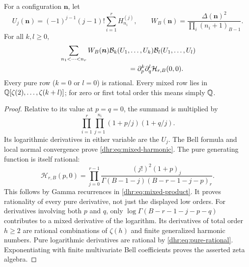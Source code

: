 \begin{theorem}
\label{dhr:thm:mixed}
For a configuration $\bm n$, let
\[
 U_j(\bm n)=(-1)^{j-1}(j-1)!\sum_{i=1}^rH_{n_i}^{(j)},\qquad
 W_B(\bm n)=\frac{\Delta(\bm n)^2}{\prod_i(n_i+1)_{B-1}}.
\]
For all $k,l\geq0$,
\begin{align}
 &\sum_{n_1<\cdots<n_r}W_B(\bm n)
 \Bell_k(U_1,\ldots,U_k)\Bell_l(U_1,\ldots,U_l)\notag\\
 &\hspace{35mm}=\partial_p^k\partial_q^l
               \mathcal H_{r,B}(0,0).
 \label{dhr:eq:mixed-harmonic}
\end{align}
Every pure row ($k=0$ or $l=0$) is rational. Every mixed row lies
in $\mathbb Q[\zeta(2),\ldots,\zeta(k+l)]$; for zero or first total order
this means simply $\mathbb Q$.
\end{theorem}
\begin{proof}
Relative to its value at $p=q=0$, the summand is multiplied by
\[
 \prod_{i=1}^r\prod_{j=1}^{n_i}(1+p/j)(1+q/j).
\]
Its logarithmic derivatives in either variable are the $U_j$.
The Bell formula and local normal convergence prove
\eqref{dhr:eq:mixed-harmonic}. The pure generating function is
itself rational:
\begin{equation}\label{dhr:eq:pure-rational}
 \mathcal H_{r,B}(p,0)=
 \prod_{j=0}^{r-1}
 \frac{(j!)^2(1+p)_j}
 {\Gamma(B-1-j)(B-r-1-j-p)_r}.
\end{equation}
This follows by Gamma recurrences in \eqref{dhr:eq:mixed-product}.
It proves rationality of every pure derivative, not just the displayed
low orders. For derivatives involving both $p$ and $q$, only
$\log\Gamma(B-r-1-j-p-q)$ contributes to a mixed derivative
of the logarithm. Its derivatives of total order $h\geq2$ are
rational combinations of $\zeta(h)$ and finite generalized harmonic
numbers. Pure logarithmic derivatives are rational by
\eqref{dhr:eq:pure-rational}. Exponentiating with finite multivariate
Bell coefficients proves the asserted zeta algebra.
\end{proof}

